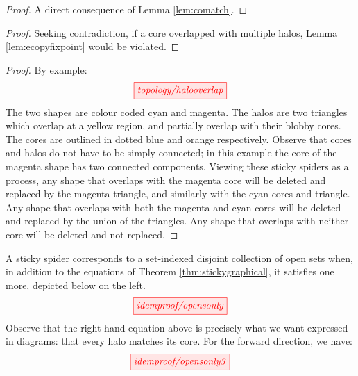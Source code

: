 \begin{myboxB}
\begin{proposition}\label{prop:core-core-exclusion}
\begin{proof}
A direct consequence of Lemma \ref{lem:comatch}.
\end{proof}
\end{proposition}
\end{myboxB}

\begin{myboxR}
\begin{proposition}\label{prop:core-halo-exclusion}
\begin{proof}
Seeking contradiction, if a core overlapped with multiple halos, Lemma \ref{lem:ecopyfixpoint} would be violated.
\end{proof}
\end{proposition}
\end{myboxR}

\begin{myboxB}
\begin{proposition}
\begin{proof}
By example:
\[\tikzfig{topology/halooverlap}\]
The two shapes are colour coded cyan and magenta. The halos are two triangles which overlap at a yellow region, and partially overlap with their blobby cores. The cores are outlined in dotted blue and orange respectively. Observe that cores and halos do not have to be simply connected; in this example the core of the magenta shape has two connected components. Viewing these sticky spiders as a process, any shape that overlaps with the magenta core will be deleted and replaced by the magenta triangle, and similarly with the cyan cores and triangle. Any shape that overlaps with both the magenta and cyan cores will be deleted and replaced by the union of the triangles. Any shape that overlaps with neither core will be deleted and not replaced.
\end{proof}
\end{proposition}
\end{myboxB}

\begin{myboxR}
\begin{corollary}
A sticky spider corresponds to a set-indexed disjoint collection of open sets when, in addition to the equations of Theorem \ref{thm:stickygraphical}, it satisfies one more, depicted below on the left.
\[\scalebox{1}{\tikzfig{idemproof/opensonly}}\]
Observe that the right hand equation above is precisely what we want expressed in diagrams: that every halo matches its core. For the forward direction, we have:
\[\scalebox{1}{\tikzfig{idemproof/opensonly3}}\]
\end{corollary}
\end{myboxR}

